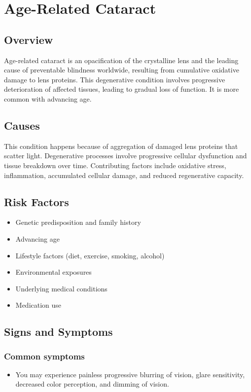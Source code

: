 \chapter{Age-Related Cataract}
\label{sec:Age-Related Cataract}

\section{Overview}
Age-related cataract is an opacification of the crystalline lens and the leading cause of preventable blindness worldwide, resulting from cumulative oxidative damage to lens proteins. This degenerative condition involves progressive deterioration of affected tissues, leading to gradual loss of function. It is more common with advancing age.
\section{Causes}
This condition happens because of aggregation of damaged lens proteins that scatter light. Degenerative processes involve progressive cellular dysfunction and tissue breakdown over time. Contributing factors include oxidative stress, inflammation, accumulated cellular damage, and reduced regenerative capacity.    
\section{Risk Factors}

\begin{itemize}[noitemsep]
  \item Genetic predisposition and family history
  \item Advancing age
  \item Lifestyle factors (diet, exercise, smoking, alcohol)
  \item Environmental exposures
  \item Underlying medical conditions
  \item Medication use
\end{itemize}
\section{Signs and Symptoms}

\subsection{Common symptoms}
\begin{itemize}[noitemsep]
  \item You may experience painless progressive blurring of vision, glare sensitivity, decreased color perception, and dimming of vision. 
  \end{itemize}

